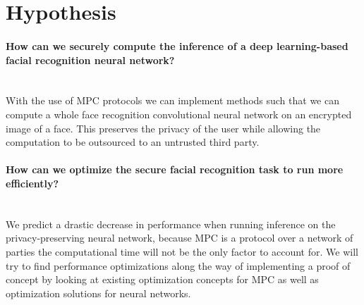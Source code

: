 \section{Hypothesis}
\label{chapter:hypothesis}
\paragraph{How can we securely compute the inference of a deep learning-based facial recognition neural network?}\mbox{} \\
With the use of MPC protocols we can implement methods such that we can compute a whole face recognition convolutional neural network on an encrypted image of a face. This preserves the privacy of the user while allowing the computation to be outsourced to an untrusted third party.
\paragraph{How can we optimize the secure facial recognition task to run more efficiently?}\mbox{}
\\
We predict a drastic decrease in performance when running inference on the privacy-preserving neural network, because MPC is a protocol over a network of parties the computational time will not be the only factor to account for. We will try to find performance optimizations along the way of implementing a proof of concept by looking at existing optimization concepts for MPC as well as optimization solutions for neural networks.
